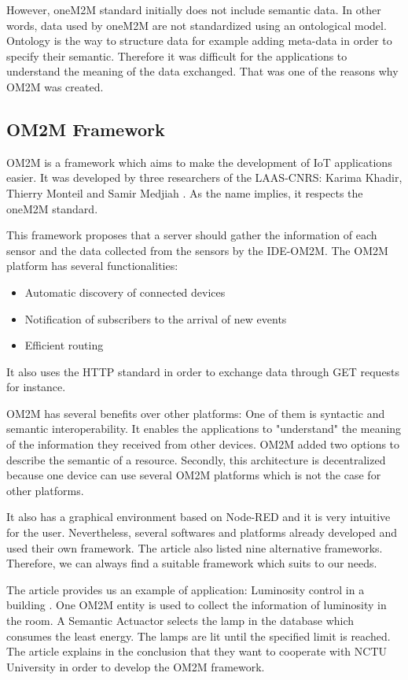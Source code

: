 However, oneM2M standard initially does not include semantic data. In other words, data used by oneM2M are not standardized using an ontological model. Ontology is the way to structure data for example adding meta-data in order to specify their semantic. Therefore it was difficult for the applications to understand the meaning of the data exchanged. That was one of the reasons why OM2M was created.


\subsection{OM2M Framework}

OM2M is a framework which aims to make the development of IoT applications easier. It was developed by three researchers of the LAAS-CNRS: Karima Khadir, Thierry Monteil and Samir Medjiah \cite{SicariSabrina2015SOSP}. As the name implies, it respects the oneM2M standard.
\smallskip

This framework proposes that a server should gather the information of each sensor and the data collected from the sensors by the IDE-OM2M.
The OM2M platform has several functionalities:  
\begin{itemize}
    \item Automatic discovery of connected devices
    \item Notification of subscribers to the arrival of new events
    \item Efficient routing 
\end{itemize}
It also uses the HTTP standard in order to exchange data through GET requests for instance.
\smallskip

OM2M has several benefits over other platforms: One of them is syntactic and semantic interoperability. It enables the applications to "understand" the meaning of the information they received from other devices. OM2M added two options to describe the semantic of a resource.
Secondly, this architecture is decentralized because one device can use several OM2M platforms which is not the case for other platforms.
\smallskip

It also has a graphical environment based on Node-RED and it is very intuitive for the user. Nevertheless, several softwares and platforms already developed and used their own framework. The article also listed nine alternative frameworks. Therefore, we can always find a suitable framework which suits to our needs.
\smallskip

The article provides us an example of application: Luminosity control in a building \cite{SicariSabrina2015SOSP}. One OM2M entity is used to collect the information of luminosity in the room. A Semantic Actuactor selects the lamp in the database which consumes the least energy. The lamps are lit until the specified limit is reached.
The article explains in the conclusion that they want to cooperate with NCTU University in order to develop the OM2M framework.